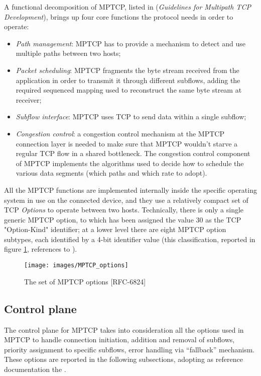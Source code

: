 A functional decomposition of MPTCP, listed in  (\textit{Guidelines for Multipath TCP Development}), brings up four core functions the protocol needs in order to operate:
\begin{itemize}
  \item \textit{Path management}: MPTCP has to provide a mechanism to detect and use multiple paths between two hosts;
  \item \textit{Packet scheduling}: MPTCP fragments the byte stream received from the application in order to transmit it through different subflows, adding the required sequenced mapping used to reconstruct the same byte stream at receiver;
  \item \textit{Subflow interface}: MPTCP uses TCP to send data within a single subflow;
  \item \textit{Congestion control}: a congestion control mechanism at the MPTCP connection layer is needed to make sure that MPTCP wouldn't starve a regular TCP flow in a shared bottleneck. The congestion control component of MPTCP implements the algorithms used to decide how to schedule the various data segments (which paths and which rate to adopt).
  \end{itemize}

All the MPTCP functions are implemented internally inside the specific operating system in use on the connected device, and they use a relatively compact set of TCP \textit{Options} to operate between two hosts. Technically, there is only a single generic MPTCP option, to which has been assigned the value 30 as the TCP "Option-Kind" identifier; at a lower level there are eight MPTCP option subtypes, each identified by a 4-bit identifier value (this classification, reported in figure \ref{fig:MPTCP_options}, references to ). 

\begin{figure}[!htb]
\centering
\texttt{[image: images/MPTCP\_options]}
\caption{The set of MPTCP options [RFC-6824]}
\label{fig:MPTCP_options}
\end{figure}

\subsection{Control plane}
The control plane for MPTCP takes into consideration all the options used in MPTCP to handle connection initiation, addition and removal of subflows, priority assignment to specific subflows, error handling via ``fallback'' mechanism. These options are reported in the following subsections, adopting as reference documentation the .

